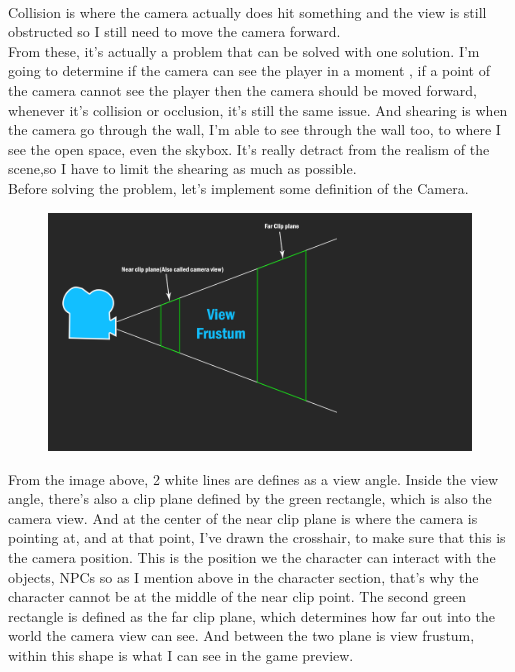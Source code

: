 \documentclass[a4paper, 13pt]{extarticle}
\begin{document}
 \\[0.05cm]
  Collision is where the camera actually does hit something and the view is still obstructed so I still need to move the camera forward. 
  \\[0.05cm] From these, it's actually a problem that can be solved with one solution. I'm going to determine if the camera can see the player in a moment , if a point of the camera cannot see the player then the camera should be moved forward, whenever it's collision or occlusion, it's still the same issue. And shearing is when the camera go through the wall, I'm able to see through the wall too, to where I see the open space, even the skybox. It's really detract from the realism of the scene,so I have to limit the shearing as much as possible.  	
  \\[0.15cm]
  Before solving the problem, let's implement some definition of the Camera.
  \newpage
  \begin{figure}[h]
  	\centering
  	\begin{minipage}{.4\textwidth}
  		\centering
  		\includegraphics[width=1.7\linewidth]{intructions/Camera_overview.png}
  		\centering
  		\label{fig:test12}
  	\end{minipage}
  \end{figure} 
From the image above, 2 white lines are defines as a view angle. Inside the view angle, there's also a clip plane defined by the green rectangle, which is also the camera view. And at the center of the near clip plane is where the camera is pointing at, and at that point, I've drawn the crosshair, to make sure that this is the camera position. This is the position we the character can interact with the objects, NPCs so as I mention above in the character section, that's why the character cannot be at the middle of the near clip point. The second green rectangle is defined as the far clip plane, which determines how far out into the world the camera view can see. And between the two plane is view frustum, within this shape is what I can see in the game preview.
\end{document}
